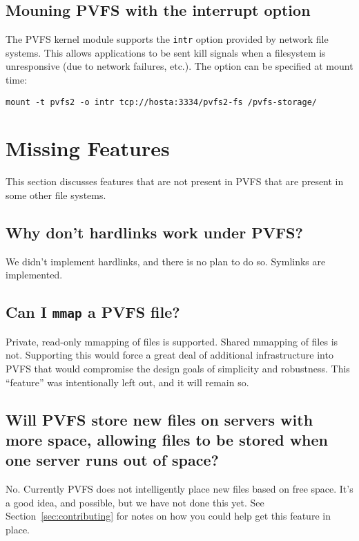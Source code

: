 \documentclass[11pt,letterpaper]{article}
\begin{document}
\subsection{Mouning PVFS with the interrupt option}
\label{sec:mountintr}
The PVFS kernel module supports the {\tt intr} option provided by
network file systems.  This allows applications to be sent kill signals
when a filesystem is unresponsive (due to network failures, etc.).  The
option can be specified at mount time:
\begin{verbatim}
mount -t pvfs2 -o intr tcp://hosta:3334/pvfs2-fs /pvfs-storage/
\end{verbatim}

%
%
\section{Missing Features}

This section discusses features that are not present in PVFS that are present
in some other file systems.

\subsection{Why don't hardlinks work under PVFS?}

We didn't implement hardlinks, and there is no plan to do so.  Symlinks are
implemented.

\subsection{Can I \texttt{mmap} a PVFS file?}

Private, read-only mmapping of files is supported.  Shared mmapping of files
is not.  Supporting this would force a great deal of additional infrastructure
into PVFS that would compromise the design goals of simplicity and
robustness.  This ``feature'' was intentionally left out, and it will remain
so.

\subsection{Will PVFS store new files on servers with more space, allowing
            files to be stored when one server runs out of space?}

No.  Currently PVFS does not intelligently place new files based on free
space.  It's a good idea, and possible, but we have not done this yet.  See
Section~\ref{sec:contributing} for notes on how you could help get this
feature in place.
\end{document}
